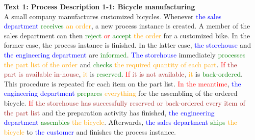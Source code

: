\textbf{Text 1: Process Description 1-1: Bicycle manufacturing}\\
A small company manufactures customized bicycles. Whenever \textcolor{blue}{the} \textcolor{blue}{sales} \textcolor{blue}{department} \textcolor{green}{receives} \textcolor{orange}{an} \textcolor{orange}{order}, a new process instance is created. A member of the sales department can then \textcolor{green}{reject} \textcolor{red}{or} \textcolor{green}{accept} \textcolor{orange}{the} \textcolor{orange}{order} for a customized bike. In the former case, the process instance is finished. In the latter case, \textcolor{blue}{the} \textcolor{blue}{storehouse} and \textcolor{blue}{the} \textcolor{blue}{engineering} \textcolor{blue}{department} are \textcolor{green}{informed}. \textcolor{blue}{The} \textcolor{blue}{storehouse} immediately \textcolor{green}{processes} \textcolor{orange}{the} \textcolor{orange}{part} \textcolor{orange}{list} \textcolor{orange}{of} \textcolor{orange}{the} \textcolor{orange}{order} and \textcolor{green}{checks} \textcolor{orange}{the} \textcolor{orange}{required} \textcolor{orange}{quantity} \textcolor{orange}{of} \textcolor{orange}{each} \textcolor{orange}{part}. \textcolor{red}{If} \textcolor{brown}{the} \textcolor{brown}{part} \textcolor{brown}{is} \textcolor{brown}{available} \textcolor{brown}{in-house}, \textcolor{orange}{it} is \textcolor{green}{reserved}. \textcolor{red}{If} \textcolor{brown}{it} \textcolor{brown}{is} \textcolor{brown}{not} \textcolor{brown}{available}, \textcolor{orange}{it} is \textcolor{green}{back-ordered}. This procedure is repeated for each item on the part list. \textcolor{red}{In} \textcolor{red}{the} \textcolor{red}{meantime}, \textcolor{blue}{the} \textcolor{blue}{engineering} \textcolor{blue}{department} \textcolor{green}{prepares} \textcolor{orange}{everything} for the assembling of the ordered bicycle. \textcolor{red}{If} \textcolor{brown}{the} \textcolor{brown}{storehouse} \textcolor{brown}{has} \textcolor{brown}{successfully} \textcolor{brown}{reserved} \textcolor{brown}{or} \textcolor{brown}{back-ordered} \textcolor{brown}{every} \textcolor{brown}{item} \textcolor{brown}{of} \textcolor{brown}{the} \textcolor{brown}{part} \textcolor{brown}{list} and the preparation activity has finished, \textcolor{blue}{the} \textcolor{blue}{engineering} \textcolor{blue}{department} \textcolor{green}{assembles} \textcolor{orange}{the} \textcolor{orange}{bicycle}. Afterwards, \textcolor{blue}{the} \textcolor{blue}{sales} \textcolor{blue}{department} \textcolor{green}{ships} \textcolor{orange}{the} \textcolor{orange}{bicycle} to \textcolor{blue}{the} \textcolor{blue}{customer} and finishes the process instance.


